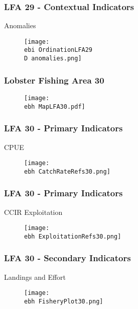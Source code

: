\documentclass{beamer}
\newcommand{\ebh}{\string~/bio.data/bio.lobster/figures/Assessment/LFA2732/} %
\newcommand{\ebi}{\string~/bio.data/bio.lobster/figures/Assessment/Indicators/} %
\newcommand{\D}{.}
\begin{document}
\begin{frame}
\frametitle{LFA 29 - Contextual Indicators}
Anomalies
\begin{figure}
        \begin{center}
            \texttt{[image: \\ebi OrdinationLFA29\\D anomalies.png]}
        \end{center}
    \end{figure}
\end{frame}







\begin{frame}
\frametitle{Lobster Fishing Area 30}
\begin{figure}
        \begin{center}
            \texttt{[image: \\ebh MapLFA30.pdf]}
        \end{center}
    \end{figure}
\end{frame}


\begin{frame}
\frametitle{LFA 30 - Primary Indicators}
CPUE
\begin{figure}
        \begin{center}
            \texttt{[image: \\ebh CatchRateRefs30.png]}
        \end{center}
    \end{figure}
\end{frame}



\begin{frame}
\frametitle{LFA 30 - Primary Indicators}
CCIR Exploitation 
\begin{figure}
        \begin{center}
            \texttt{[image: \\ebh ExploitationRefs30.png]}
        \end{center}
    \end{figure}
\end{frame}




\begin{frame}
\frametitle{LFA 30 - Secondary Indicators}
Landings and Effort
\begin{figure}
        \begin{center}
            \texttt{[image: \\ebh FisheryPlot30.png]}
        \end{center}
    \end{figure}
\end{frame}
\end{document}
